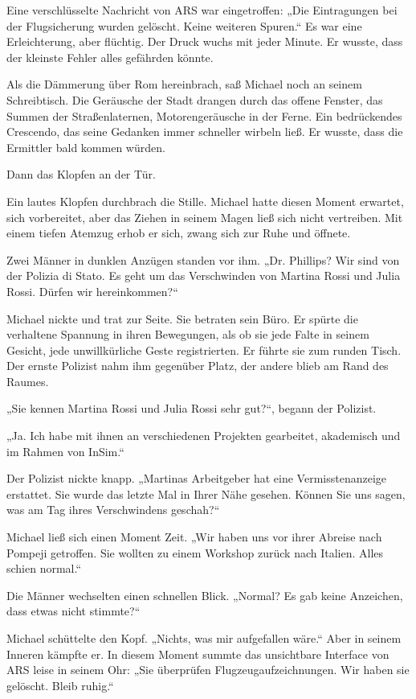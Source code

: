 \documentclass[
]{article}
\begin{document}
Eine verschlüsselte Nachricht von ARS war eingetroffen: „Die Eintragungen bei der Flugsicherung wurden gelöscht. Keine weiteren Spuren.`` Es war eine Erleichterung, aber flüchtig. Der Druck wuchs mit jeder Minute. Er wusste, dass der kleinste Fehler alles gefährden könnte.

Als die Dämmerung über Rom hereinbrach, saß Michael noch an seinem Schreibtisch. Die Geräusche der Stadt drangen durch das offene Fenster, das Summen der Straßenlaternen, Motorengeräusche in der Ferne. Ein bedrückendes Crescendo, das seine Gedanken immer schneller wirbeln ließ. Er wusste, dass die Ermittler bald kommen würden.

Dann das Klopfen an der Tür.

Ein lautes Klopfen durchbrach die Stille. Michael hatte diesen Moment erwartet, sich vorbereitet, aber das Ziehen in seinem Magen ließ sich nicht vertreiben. Mit einem tiefen Atemzug erhob er sich, zwang sich zur Ruhe und öffnete.

Zwei Männer in dunklen Anzügen standen vor ihm. „Dr. Phillips? Wir sind von der Polizia di Stato. Es geht um das Verschwinden von Martina Rossi und Julia Rossi. Dürfen wir hereinkommen?{\kern0pt}``

Michael nickte und trat zur Seite. Sie betraten sein Büro. Er spürte die verhaltene Spannung in ihren Bewegungen, als ob sie jede Falte in seinem Gesicht, jede unwillkürliche Geste registrierten. Er führte sie zum runden Tisch. Der ernste Polizist nahm ihm gegenüber Platz, der andere blieb am Rand des Raumes.

„Sie kennen Martina Rossi und Julia Rossi sehr gut?{\kern0pt}``, begann der Polizist.

„Ja. Ich habe mit ihnen an verschiedenen Projekten gearbeitet, akademisch und im Rahmen von InSim.``

Der Polizist nickte knapp. „Martinas Arbeitgeber hat eine Vermisstenanzeige erstattet. Sie wurde das letzte Mal in Ihrer Nähe gesehen. Können Sie uns sagen, was am Tag ihres Verschwindens geschah?{\kern0pt}``

Michael ließ sich einen Moment Zeit. „Wir haben uns vor ihrer Abreise nach Pompeji getroffen. Sie wollten zu einem Workshop zurück nach Italien. Alles schien normal.``

Die Männer wechselten einen schnellen Blick. „Normal? Es gab keine Anzeichen, dass etwas nicht stimmte?{\kern0pt}``

Michael schüttelte den Kopf. „Nichts, was mir aufgefallen wäre.`` Aber in seinem Inneren kämpfte er. In diesem Moment summte das unsichtbare Interface von ARS leise in seinem Ohr: „Sie überprüfen Flugzeugaufzeichnungen. Wir haben sie gelöscht. Bleib ruhig.``
\end{document}
